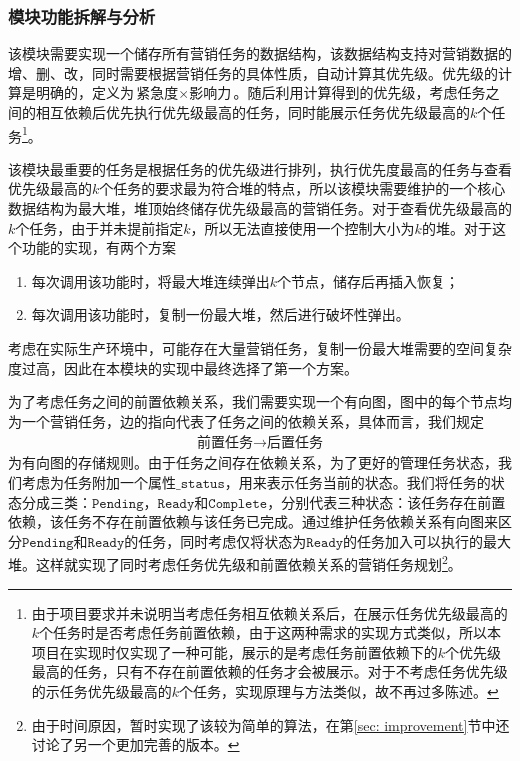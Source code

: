 \documentclass[cn,hazy,blue,10pt,normal]{elegantnote}
\begin{document}
\subsubsection{模块功能拆解与分析}
该模块需要实现一个储存所有营销任务的数据结构，该数据结构支持对营销数据的增、删、改，同时需要根据营销任务的具体性质，自动计算其优先级。优先级的计算是明确的，定义为$\text{紧急度}\times\text{影响力}$。随后利用计算得到的优先级，考虑任务之间的相互依赖后优先执行优先级最高的任务，同时能展示任务优先级最高的$k$个任务\footnote{由于项目要求并未说明当考虑任务相互依赖关系后，在展示任务优先级最高的$k$个任务时是否考虑任务前置依赖，由于这两种需求的实现方式类似，所以本项目在实现时仅实现了一种可能，展示的是考虑任务前置依赖下的$k$个优先级最高的任务，只有不存在前置依赖的任务才会被展示。对于不考虑任务优先级的示任务优先级最高的$k$个任务，实现原理与方法类似，故不再过多陈述。}。

该模块最重要的任务是根据任务的优先级进行排列，执行优先度最高的任务与查看优先级最高的$k$个任务的要求最为符合堆的特点，所以该模块需要维护的一个核心数据结构为最大堆，堆顶始终储存优先级最高的营销任务。对于查看优先级最高的$k$个任务，由于并未提前指定$k$，所以无法直接使用一个控制大小为$k$的堆。对于这个功能的实现，有两个方案
\begin{enumerate}
    \item 每次调用该功能时，将最大堆连续弹出$k$个节点，储存后再插入恢复；
    \item 每次调用该功能时，复制一份最大堆，然后进行破坏性弹出。
\end{enumerate}
考虑在实际生产环境中，可能存在大量营销任务，复制一份最大堆需要的空间复杂度过高，因此在本模块的实现中最终选择了第一个方案。

为了考虑任务之间的前置依赖关系，我们需要实现一个有向图，图中的每个节点均为一个营销任务，边的指向代表了任务之间的依赖关系，具体而言，我们规定
\begin{align*}
    \text{前置任务} \longrightarrow \text{后置任务}
\end{align*}
为有向图的存储规则。由于任务之间存在依赖关系，为了更好的管理任务状态，我们考虑为任务附加一个属性$\mathtt{\_status}$，用来表示任务当前的状态。我们将任务的状态分成三类：$\mathtt{Pending}$，$\mathtt{Ready}$和$\mathtt{Complete}$，分别代表三种状态：该任务存在前置依赖，该任务不存在前置依赖与该任务已完成。通过维护任务依赖关系有向图来区分$\mathtt{Pending}$和$\mathtt{Ready}$的任务，同时考虑仅将状态为$\mathtt{Ready}$的任务加入可以执行的最大堆。这样就实现了同时考虑任务优先级和前置依赖关系的营销任务规划\footnote{由于时间原因，暂时实现了该较为简单的算法，在第\ref{sec: improvement}节中还讨论了另一个更加完善的版本。}。
\end{document}
